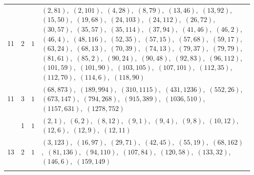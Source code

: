 \documentclass[11pt]{article}
\begin{document}
\begin{longtable}{@{}rrl>{\raggedright\arraybackslash}p{}@{}}
11 & 2 & $1$ & $(2,81)$,\allowbreak\ $(2,101)$,\allowbreak\ $(4,28)$,\allowbreak\ $(8,79)$,\allowbreak\ $(13,46)$,\allowbreak\ $(13,92)$,\allowbreak\ $(15,50)$,\allowbreak\ $(19,68)$,\allowbreak\ $(24,103)$,\allowbreak\ $(24,112)$,\allowbreak\ $(26,72)$,\allowbreak\ $(30,57)$,\allowbreak\ $(35,57)$,\allowbreak\ $(35,114)$,\allowbreak\ $(37,94)$,\allowbreak\ $(41,46)$,\allowbreak\ $(46,2)$,\allowbreak\ $(46,4)$,\allowbreak\ $(48,116)$,\allowbreak\ $(52,35)$,\allowbreak\ $(57,15)$,\allowbreak\ $(57,68)$,\allowbreak\ $(59,17)$,\allowbreak\ $(63,24)$,\allowbreak\ $(68,13)$,\allowbreak\ $(70,39)$,\allowbreak\ $(74,13)$,\allowbreak\ $(79,37)$,\allowbreak\ $(79,79)$,\allowbreak\ $(81,61)$,\allowbreak\ $(85,2)$,\allowbreak\ $(90,24)$,\allowbreak\ $(90,48)$,\allowbreak\ $(92,83)$,\allowbreak\ $(96,112)$,\allowbreak\ $(101,59)$,\allowbreak\ $(101,90)$,\allowbreak\ $(103,105)$,\allowbreak\ $(107,101)$,\allowbreak\ $(112,35)$,\allowbreak\ $(112,70)$,\allowbreak\ $(114,6)$,\allowbreak\ $(118,90)$\\
11 & 3 & $1$ & $(68,873)$,\allowbreak\ $(189,994)$,\allowbreak\ $(310,1115)$,\allowbreak\ $(431,1236)$,\allowbreak\ $(552,26)$,\allowbreak\ $(673,147)$,\allowbreak\ $(794,268)$,\allowbreak\ $(915,389)$,\allowbreak\ $(1036,510)$,\allowbreak\ $(1157,631)$,\allowbreak\ $(1278,752)$\\
\addlinespace[3pt]
13 & 1 & $1$ & $(2,1)$,\allowbreak\ $(6,2)$,\allowbreak\ $(8,12)$,\allowbreak\ $(9,1)$,\allowbreak\ $(9,4)$,\allowbreak\ $(9,8)$,\allowbreak\ $(10,12)$,\allowbreak\ $(12,6)$,\allowbreak\ $(12,9)$,\allowbreak\ $(12,11)$\\
13 & 2 & $1$ & $(3,123)$,\allowbreak\ $(16,97)$,\allowbreak\ $(29,71)$,\allowbreak\ $(42,45)$,\allowbreak\ $(55,19)$,\allowbreak\ $(68,162)$,\allowbreak\ $(81,136)$,\allowbreak\ $(94,110)$,\allowbreak\ $(107,84)$,\allowbreak\ $(120,58)$,\allowbreak\ $(133,32)$,\allowbreak\ $(146,6)$,\allowbreak\ $(159,149)$\\
\addlinespace[3pt]
\end{longtable}
\endgroup
\end{document}
